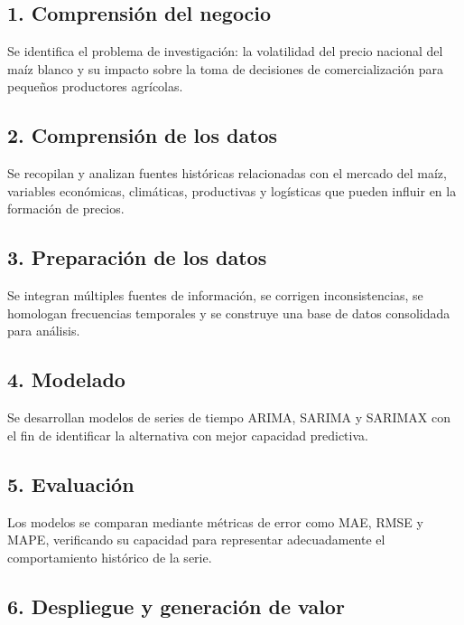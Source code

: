 \documentclass[11pt]{article}
\begin{document}
\hypertarget{comprensiuxf3n-del-negocio}{%
\subsection{1. Comprensión del
negocio}\label{comprensiuxf3n-del-negocio}}

Se identifica el problema de investigación: la volatilidad del precio
nacional del maíz blanco y su impacto sobre la toma de decisiones de
comercialización para pequeños productores agrícolas.

\hypertarget{comprensiuxf3n-de-los-datos}{%
\subsection{2. Comprensión de los
datos}\label{comprensiuxf3n-de-los-datos}}

Se recopilan y analizan fuentes históricas relacionadas con el mercado
del maíz, variables económicas, climáticas, productivas y logísticas que
pueden influir en la formación de precios.

\hypertarget{preparaciuxf3n-de-los-datos}{%
\subsection{3. Preparación de los
datos}\label{preparaciuxf3n-de-los-datos}}

Se integran múltiples fuentes de información, se corrigen
inconsistencias, se homologan frecuencias temporales y se construye una
base de datos consolidada para análisis.

\hypertarget{modelado}{%
\subsection{4. Modelado}\label{modelado}}

Se desarrollan modelos de series de tiempo ARIMA, SARIMA y SARIMAX con
el fin de identificar la alternativa con mejor capacidad predictiva.

\hypertarget{evaluaciuxf3n}{%
\subsection{5. Evaluación}\label{evaluaciuxf3n}}

Los modelos se comparan mediante métricas de error como MAE, RMSE y
MAPE, verificando su capacidad para representar adecuadamente el
comportamiento histórico de la serie.

\hypertarget{despliegue-y-generaciuxf3n-de-valor}{%
\subsection{6. Despliegue y generación de
valor}\label{despliegue-y-generaciuxf3n-de-valor}}
\end{document}
